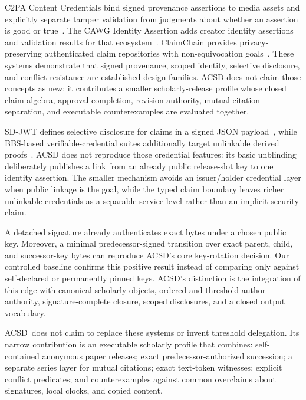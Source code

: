 \documentclass[11pt]{article}
\newcommand{\acsd}{\textsc{ACSD}}
\begin{document}
C2PA Content Credentials bind signed provenance assertions to media assets and
explicitly separate tamper validation from judgments about whether an assertion
is good or true~\cite{c2pa}. The CAWG Identity Assertion adds creator identity
assertions and validation results for that ecosystem~\cite{cawg}. ClaimChain
provides privacy-preserving authenticated claim repositories with
non-equivocation goals~\cite{claimchain}. These systems demonstrate that signed
provenance, scoped identity, selective disclosure, and conflict resistance are
established design families. ACSD does not claim those concepts as new; it
contributes a smaller scholarly-release profile whose closed claim algebra,
approval completion, revision authority, mutual-citation separation, and
executable counterexamples are evaluated together.

SD-JWT defines selective disclosure for claims in a signed JSON payload~\cite{sdjwt}, while BBS-based verifiable-credential suites additionally target unlinkable derived proofs~\cite{bbs}. ACSD does not reproduce those credential features: its basic unblinding deliberately publishes a link from an already public release-slot key to one identity assertion. The smaller mechanism avoids an issuer/holder credential layer when public linkage is the goal, while the typed claim boundary leaves richer unlinkable credentials as a separable service level rather than an implicit security claim.

A detached signature already authenticates exact bytes under a chosen public
key. Moreover, a minimal predecessor-signed transition over exact parent,
child, and successor-key bytes can reproduce ACSD's core key-rotation decision.
Our controlled baseline confirms this positive result instead of comparing only
against self-declared or permanently pinned keys. ACSD's distinction is the
integration of this edge with canonical scholarly objects, ordered and
threshold author authority, signature-complete closure, scoped disclosures,
and a closed output vocabulary.

\acsd\ does not claim to replace these systems or invent threshold delegation. Its narrow contribution is an executable scholarly profile that combines: self-contained anonymous paper releases; exact predecessor-authorized succession; a separate series layer for mutual citations; exact text-token witnesses; explicit conflict predicates; and counterexamples against common overclaims about signatures, local clocks, and copied content.
\end{document}
